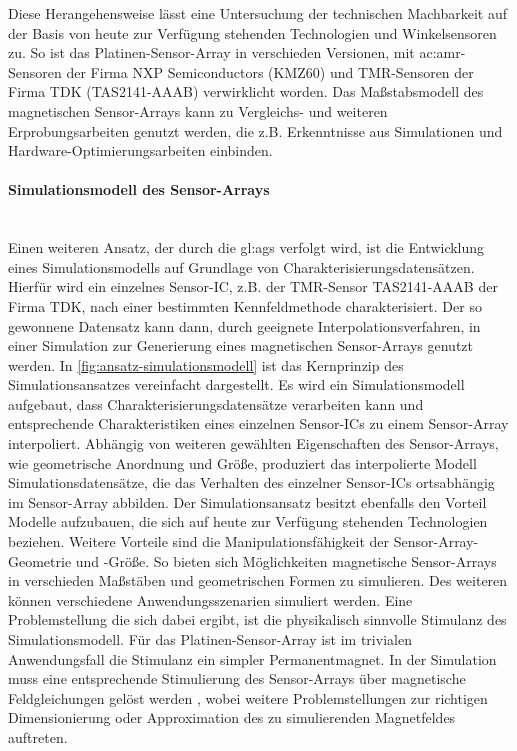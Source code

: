 \clearpage


Diese Herangehensweise lässt eine Untersuchung der technischen Machbarkeit auf der Basis von heute zur Verfügung stehenden Technologien und Winkelsensoren zu.
So ist das Platinen-Sensor-Array in verschieden Versionen, mit \gls{ac:amr}-Sensoren der Firma NXP Semiconductors (KMZ60) \cite{NXPSemiconductors2014} und TMR-Sensoren der Firma TDK (TAS2141-AAAB) \cite{TDK2016} verwirklicht worden. Das Maßstabsmodell des magnetischen Sensor-Arrays kann zu Vergleichs- und weiteren Erprobungsarbeiten genutzt werden, die z.B. Erkenntnisse aus Simulationen und Hardware-Optimierungsarbeiten einbinden.


\paragraph{Simulationsmodell des Sensor-Arrays}\label{par:simulationsmodell-des-sensor-arrays}$~$\\


Einen weiteren Ansatz, der durch die \gls{gl:ags} verfolgt wird, ist die Entwicklung eines Simulationsmodells auf Grundlage von Charakterisierungsdatensätzen. Hierfür wird ein einzelnes Sensor-IC, z.B. der TMR-Sensor TAS2141-AAAB der Firma TDK, nach einer bestimmten Kennfeldmethode \cite{Schuethe2019} charakterisiert. Der so gewonnene Datensatz kann dann, durch geeignete Interpolationsverfahren, in einer Simulation zur Generierung eines magnetischen Sensor-Arrays genutzt werden. In \autoref{fig:ansatz-simulationsmodell} ist das Kernprinzip des Simulationsansatzes vereinfacht dargestellt. Es wird ein Simulationsmodell aufgebaut, dass Charakterisierungsdatensätze verarbeiten kann und entsprechende Charakteristiken eines einzelnen Sensor-ICs zu einem Sensor-Array interpoliert. Abhängig von weiteren gewählten Eigenschaften des Sensor-Arrays, wie geometrische Anordnung und Größe, produziert das interpolierte Modell Simulationsdatensätze, die das Verhalten des einzelner Sensor-ICs ortsabhängig im Sensor-Array abbilden.
\newline
Der Simulationsansatz besitzt ebenfalls den Vorteil Modelle aufzubauen, die sich auf heute zur Verfügung stehenden Technologien beziehen. Weitere Vorteile sind die Manipulationsfähigkeit der Sensor-Array-Geometrie und -Größe. So bieten sich Möglichkeiten magnetische Sensor-Arrays in verschieden Maßstäben und geometrischen Formen zu simulieren. Des weiteren können verschiedene Anwendungsszenarien simuliert werden. Eine Problemstellung die sich dabei ergibt, ist die physikalisch sinnvolle Stimulanz des Simulationsmodell. Für das Platinen-Sensor-Array ist im trivialen Anwendungsfall die Stimulanz ein simpler Permanentmagnet. In der Simulation muss eine entsprechende Stimulierung des Sensor-Arrays über magnetische Feldgleichungen gelöst werden \cite{Pape2017}\cite{Schuethe2019}, wobei weitere Problemstellungen zur richtigen Dimensionierung oder Approximation des zu simulierenden Magnetfeldes auftreten.


